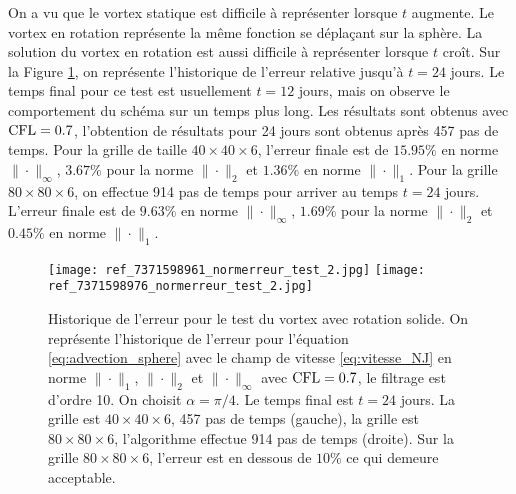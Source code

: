 On a vu que le vortex statique est difficile à représenter lorsque $t$ augmente. Le vortex en rotation représente la même fonction se déplaçant sur la sphère. La solution du vortex en rotation est aussi difficile à représenter lorsque $t$ croît. Sur la Figure \ref{fig:NJ24jours}, on représente l'historique de l'erreur relative jusqu'à $t=24$ jours. Le temps final pour ce test est usuellement $t=12$ jours, mais on observe le comportement du schéma sur un temps plus long. Les résultats sont obtenus avec $\text{CFL} = 0.7$, l'obtention de résultats pour 24 jours sont obtenus après 457 pas de temps. Pour la grille de taille $40 \times 40 \times 6$, l'erreur finale est de $15.95\%$ en norme $\| \cdot \|_{\infty}$, $3.67\%$ pour la norme $\| \cdot \|_{2}$ et $1.36\%$ en norme $\| \cdot \|_{1}$. Pour la grille $80 \times 80 \times 6$, on effectue 914 pas de temps pour arriver au temps $t=24$ jours. L'erreur finale est de $9.63\%$ en norme $\| \cdot \|_{\infty}$, $1.69\%$ pour la norme $\| \cdot \|_{2}$ et $0.45\%$ en norme $\| \cdot \|_{1}$.

\begin{figure}[htbp]
\begin{center}
\texttt{[image: ref\_7371598961\_normerreur\_test\_2.jpg]}
\texttt{[image: ref\_7371598976\_normerreur\_test\_2.jpg]}
\end{center}
\caption{Historique de l'erreur pour le test du vortex avec rotation solide. On représente l'historique de l'erreur pour l'équation \eqref{eq:advection_sphere} avec le champ de vitesse \eqref{eq:vitesse_NJ} en norme $\| \cdot \|_1$, $\| \cdot \|_2$ et $\| \cdot \|_{\infty}$ avec $\text{CFL} = 0.7$, le filtrage est d'ordre 10. On choisit $\alpha = \pi/4$. Le temps final est $t=24$ jours. La grille est $40 \times 40  \times 6$, 457 pas de temps (gauche), la grille est $80 \times 80  \times 6$, l'algorithme effectue 914 pas de temps (droite). Sur la grille $80 \times 80 \times 6$, l'erreur est en dessous de $10 \%$ ce qui demeure acceptable.}
\label{fig:NJ24jours}
\end{figure} 

